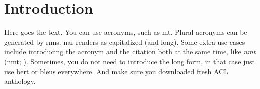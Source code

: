 \chapter{Introduction}%
\label{chap:intro}

Here goes the text. You can use acronyms, such as \ac{mt}. Plural acronyms can
be generated by \acp{rnn}. \Acl{nar} renders as capitalized (and long). Some
extra use-cases include introducing the acronym and the citation both at the
same time, like \emph{\acl{nmt}} (\acs{nmt};
\citealp{bahdanau2014neural,vaswani2017attention}).  Sometimes, you do not need
to introduce the long form, in that case just use \acs{bert}
\citep{devlin-etal-2019-bert} or \acsp{bleu} everywhere. And make sure you
downloaded fresh ACL anthology.
